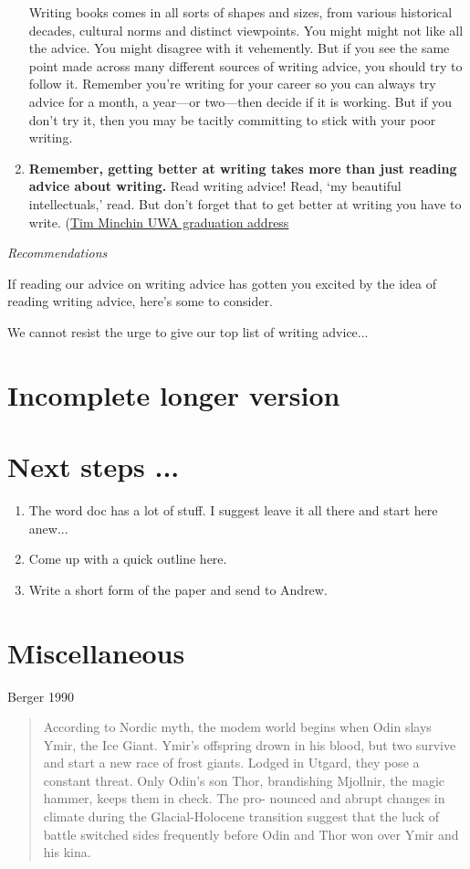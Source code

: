 \documentclass[11pt,letter]{article}
\begin{document}
\begin{enumerate}
Writing books comes in all sorts of shapes and sizes, from various historical decades, cultural norms and distinct viewpoints. You might might not like all the advice. You might disagree with it vehemently. But if you see the same point made across many different sources of writing advice, you should try to follow it. Remember you're writing for your career so you can always try advice for a month, a year---or two---then decide if it is working. But if you don't try it, then you may be tacitly committing to stick with your poor writing. 
\item {\bf Remember, getting better at writing takes more than just reading advice about writing.} Read writing advice! Read,  `my beautiful intellectuals,' read.  But don't forget that to get better at writing you have to write.  (\href{https://www.youtube.com/watch?v=yoEezZD71sc}{Tim Minchin UWA graduation address} %
\end{enumerate}


\emph{Recommendations}

If reading our advice on writing advice has gotten you excited by the idea of reading writing advice, here's some to consider. 

We cannot resist the urge to give our top list of writing advice... 


\section{Incomplete longer version}


\section{Next steps ...}
\begin{enumerate}
\item The word doc has a lot of stuff. I suggest leave it all there and start here anew...
\item Come up with a quick outline here.
\item Write a short form of the paper and send to Andrew. 
\end{enumerate}

\section{Miscellaneous}
Berger 1990
\begin{quote}
According to Nordic myth, the modem world begins when Odin slays Ymir, the Ice Giant. Ymir's offspring drown in his blood, but two survive and start a new race of frost giants. Lodged in Utgard, they pose a constant threat. Only Odin's son Thor, brandishing Mjollnir, the magic hammer, keeps them in check. The pro- nounced and abrupt changes in climate during the Glacial-Holocene transition suggest that the luck of battle switched sides frequently before Odin and Thor won over Ymir and his kina.
\end{quote}
\end{document}
